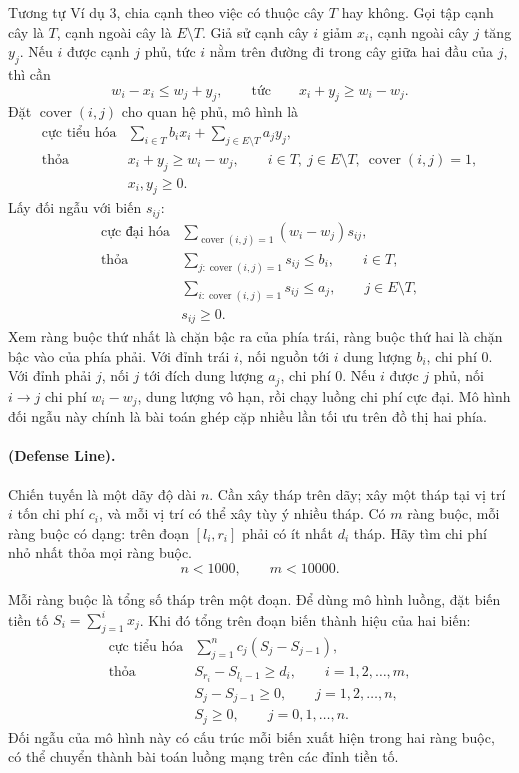 \documentclass[11pt]{article}
\begin{document}
Tương tự Ví dụ 3, chia cạnh theo việc có thuộc cây \(T\) hay không. Gọi tập
cạnh cây là \(T\), cạnh ngoài cây là \(E\setminus T\). Giả sử cạnh cây \(i\)
giảm \(x_i\), cạnh ngoài cây \(j\) tăng \(y_j\). Nếu \(i\) được cạnh \(j\)
phủ, tức \(i\) nằm trên đường đi trong cây giữa hai đầu của \(j\), thì cần
\[
  w_i-x_i\le w_j+y_j,\qquad\text{tức}\qquad x_i+y_j\ge w_i-w_j.
\]
Đặt \(\operatorname{cover}(i,j)\) cho quan hệ phủ, mô hình là
\[
\begin{array}{ll}
\text{cực tiểu hóa} &
  \displaystyle \sum_{i\in T}b_ix_i+\sum_{j\in E\setminus T}a_jy_j,\\
\text{thỏa} &
  x_i+y_j\ge w_i-w_j,\qquad
  i\in T,\ j\in E\setminus T,\ \operatorname{cover}(i,j)=1,\\
& x_i,y_j\ge 0.
\end{array}
\]
Lấy đối ngẫu với biến \(s_{ij}\):
\[
\begin{array}{ll}
\text{cực đại hóa} &
  \displaystyle \sum_{\operatorname{cover}(i,j)=1}(w_i-w_j)s_{ij},\\
\text{thỏa} &
  \displaystyle \sum_{j:\operatorname{cover}(i,j)=1}s_{ij}\le b_i,
  \qquad i\in T,\\
& \displaystyle \sum_{i:\operatorname{cover}(i,j)=1}s_{ij}\le a_j,
  \qquad j\in E\setminus T,\\
& s_{ij}\ge 0.
\end{array}
\]
Xem ràng buộc thứ nhất là chặn bậc ra của phía trái, ràng buộc thứ hai là
chặn bậc vào của phía phải. Với đỉnh trái \(i\), nối nguồn tới \(i\) dung
lượng \(b_i\), chi phí \(0\). Với đỉnh phải \(j\), nối \(j\) tới đích dung
lượng \(a_j\), chi phí \(0\). Nếu \(i\) được \(j\) phủ, nối \(i\to j\) chi
phí \(w_i-w_j\), dung lượng vô hạn, rồi chạy luồng chi phí cực đại. Mô hình
đối ngẫu này chính là bài toán ghép cặp nhiều lần tối ưu trên đồ thị hai
phía.

\paragraph{ (Defense Line).}
Chiến tuyến là một dãy độ dài \(n\). Cần xây tháp trên dãy; xây một tháp tại
vị trí \(i\) tốn chi phí \(c_i\), và mỗi vị trí có thể xây tùy ý nhiều tháp.
Có \(m\) ràng buộc, mỗi ràng buộc có dạng: trên đoạn \([l_i,r_i]\) phải có
ít nhất \(d_i\) tháp. Hãy tìm chi phí nhỏ nhất thỏa mọi ràng buộc.
\[
  n<1000,\qquad m<10000.
\]

Mỗi ràng buộc là tổng số tháp trên một đoạn. Để dùng mô hình luồng, đặt biến
tiền tố \(S_i=\sum_{j=1}^{i}x_j\). Khi đó tổng trên đoạn biến thành hiệu của
hai biến:
\[
\begin{array}{ll}
\text{cực tiểu hóa} & \displaystyle \sum_{j=1}^{n}c_j(S_j-S_{j-1}),\\
\text{thỏa} & S_{r_i}-S_{l_i-1}\ge d_i,\qquad i=1,2,\ldots,m,\\
& S_j-S_{j-1}\ge 0,\qquad j=1,2,\ldots,n,\\
& S_j\ge 0,\qquad j=0,1,\ldots,n.
\end{array}
\]
Đối ngẫu của mô hình này có cấu trúc mỗi biến xuất hiện trong hai ràng buộc,
có thể chuyển thành bài toán luồng mạng trên các đỉnh tiền tố.
\end{document}
